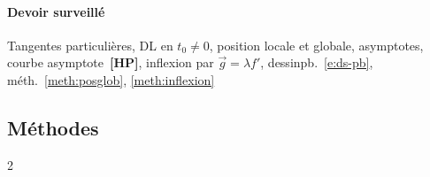 \documentclass[a4paper,11pt]{article}
\makeatletter
\numberwithin{equation}{section}
\numberwithin{figure}{section}
\numberwithin{table}{section}
\theoremstyle{enonce}
\theoremstyle{exemple}
\theoremstyle{remarque}
\newcommand{\listemethodes}{\@starttoc{met}}
\newcommand{\HP}{\,{\sffamily\bfseries\scriptsize\textcolor{Brique}{[HP]}}}
\makeatother
\begin{document}
{\paragraph{Devoir surveillé}
\noindent Tangentes particulières, DL en $t_0\neq0$, position locale et globale, asymptotes, courbe asymptote \HP, inflexion
par $\vec g=\lambda f'$, dessin\dotfill pb.~\ref{e:ds-pb}, méth.~\ref{meth:posglob}, \ref{meth:inflexion}\par
}

\subsection*{Méthodes}
{\footnotesize\begin{multicols}{2}\listemethodes\end{multicols}}
\end{document}
